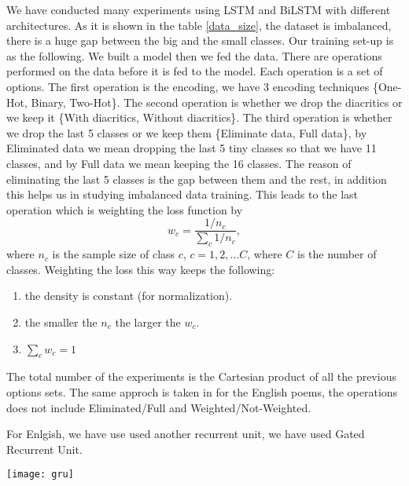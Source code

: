 \documentclass[12pt]{report}
\begin{document}
We have conducted many experiments using LSTM and BiLSTM with
different architectures. As it is shown in the table \ref{data_size}, the dataset
is imbalanced, there is a huge gap between the big and the small classes.
Our training set-up is as the following. We built a model then
we fed the data.  There are operations performed on the data before it is fed to
the model.  Each operation is a set of options. The first operation is the
encoding, we have 3 encoding techniques \{One-Hot, Binary, Two-Hot\}. The
second operation is whether we drop the diacritics or we keep it \{With
diacritics, Without diacritics\}. The third operation is whether we drop the
last 5 classes or we keep them \{Eliminate data, Full data\}, by
Eliminated data we mean dropping the last 5 tiny classes so that we have 11
classes, and by Full data we mean keeping the 16 classes.
The reason of eliminating the last 5 classes is the gap between them and the
rest, in addition this helps us in studying imbalanced data training. This
leads to the last operation which is weighting the loss function by%
\[w_c = \frac{1/n_c}{\sum\limits_{c}1/n_c},\]%
where $n_c$ is the sample size of class $c$, $c = 1, 2, ... C$, where $C$ is the number of classes.  Weighting the loss this way keeps the following:
\begin{enumerate}
  \item the density is constant (for normalization).
  \item the smaller the $n_c$ the larger the $w_c$.
  \item $\sum\limits_{c} w_c = 1$
\end{enumerate}
The total number of the experiments is the Cartesian product of all the previous
options sets. The same approch is taken in for the English poems, the operations
does not include Eliminated/Full and Weighted/Not-Weighted.

For Enlgish, we have use used another recurrent unit, we have used
Gated Recurrent Unit.

\texttt{[image: gru]}























\end{document}
